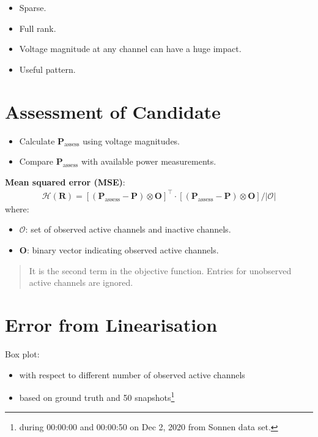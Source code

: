 \documentclass[
]{book}
\providecommand{\tightlist}{%
  \setlength{\itemsep}{0pt}\setlength{\parskip}{0pt}}
\begin{document}
\begin{itemize}
\tightlist
\item
  Sparse.
\item
  Full rank.
\item
  Voltage magnitude at any channel can have a huge impact.
\item
  Useful pattern.
\end{itemize}

\hypertarget{assessment}{%
\section{Assessment of Candidate}\label{assessment}}

\begin{itemize}
\tightlist
\item
  Calculate \(\boldsymbol{P}_\text{assess}\) using voltage magnitudes.
\item
  Compare \(\boldsymbol{P}_\text{assess}\) with available power measurements.
\end{itemize}

\textbf{Mean squared error (MSE)}:
\[ \begin{aligned}
  \mathcal{H}(\boldsymbol{R}) =
  \left[
    (\boldsymbol{P}_\text{assess} - \boldsymbol{P})
    \otimes \boldsymbol{O}
  \right]^\top
  \cdot \left[
    (\boldsymbol{P}_\text{assess} - \boldsymbol{P})
    \otimes \boldsymbol{O}
  \right]
  / |\mathcal{O}|
\end{aligned} \]
where:

\begin{itemize}
\tightlist
\item
  \(\mathcal{O}\): set of observed active channels and inactive channels.
\item
  \(\boldsymbol{O}\): binary vector indicating observed active channels.
\end{itemize}

\begin{quote}
It is the second term in the objective function. Entries for unobserved
active channels are ignored.
\end{quote}

\hypertarget{error}{%
\section{Error from Linearisation}\label{error}}

Box plot:

\begin{itemize}
\tightlist
\item
  with respect to different number of observed active channels
\item
  based on ground truth and 50 snapshots\footnote{during 00:00:00 and 00:00:50 on Dec
    2, 2020 from Sonnen data set.}
\end{itemize}
\end{document}
